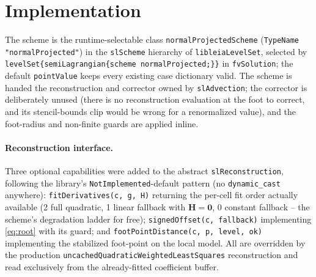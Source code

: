 \documentclass[preprint,3p,11pt]{elsarticle}
\newcommand{\Hm}{\mathbf{H}}
\begin{document}
\section{Implementation}
\label{sec:implementation}

The scheme is the runtime-selectable class \texttt{normalProjectedScheme}
(\texttt{TypeName "normalProjected"}) in the \texttt{slScheme} hierarchy of
\texttt{libleiaLevelSet}, selected by
\texttt{levelSet\{semiLagrangian\{scheme normalProjected;\}\}} in
\texttt{fvSolution}; the default \texttt{pointValue} keeps every existing case
dictionary valid. The scheme is handed the reconstruction and corrector owned
by \texttt{slAdvection}; the corrector is deliberately unused (there is no
reconstruction evaluation at the foot to correct, and its stencil-bounds clip
would be wrong for a renormalized value), and the foot-radius and non-finite
guards are applied inline.

\paragraph{Reconstruction interface.} Three optional capabilities were added
to the abstract \texttt{slReconstruction}, following the library's
\texttt{NotImplemented}-default pattern (no \texttt{dynamic\_cast} anywhere):
\texttt{fitDerivatives(c, g, H)} returning the per-cell fit order actually
available (2 full quadratic, 1 linear fallback with $\Hm=\mathbf 0$, 0
constant fallback -- the scheme's degradation ladder for free);
\texttt{signedOffset(c, fallback)} implementing \eqref{eq:root} with its
guard; and \texttt{footPointDistance(c, p, level, ok)} implementing the
stabilized foot-point on the local model. All are overridden by the
production \texttt{uncachedQuadraticWeightedLeastSquares} reconstruction and
read exclusively from the already-fitted coefficient buffer.
\end{document}
